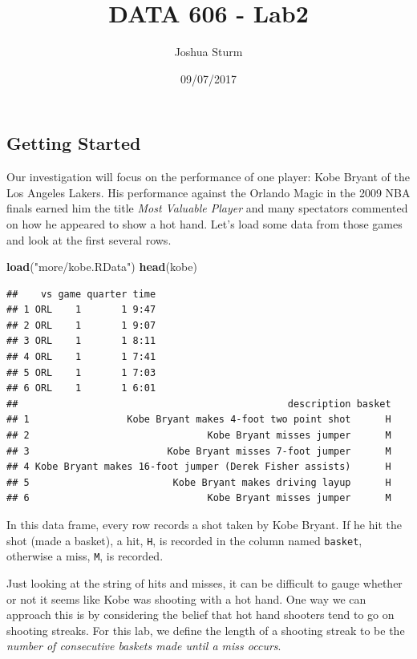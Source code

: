 \documentclass[]{article}
\title{DATA 606 - Lab2}
\author{Joshua Sturm}
\date{09/07/2017}
\newenvironment{Shaded}{\begin{snugshade}}{\end{snugshade}}
\newcommand{\KeywordTok}[1]{\textcolor[rgb]{0.13,0.29,0.53}{\textbf{{#1}}}}
\newcommand{\StringTok}[1]{\textcolor[rgb]{0.31,0.60,0.02}{{#1}}}
\newcommand{\NormalTok}[1]{{#1}}
\begin{document}
\maketitle

\subsection{Getting Started}\label{getting-started}

Our investigation will focus on the performance of one player: Kobe
Bryant of the Los Angeles Lakers. His performance against the Orlando
Magic in the 2009 NBA finals earned him the title \emph{Most Valuable
Player} and many spectators commented on how he appeared to show a hot
hand. Let's load some data from those games and look at the first
several rows.

\begin{Shaded}
\begin{Highlighting}[]
\KeywordTok{load}\NormalTok{(}\StringTok{"more/kobe.RData"}\NormalTok{)}
\KeywordTok{head}\NormalTok{(kobe)}
\end{Highlighting}
\end{Shaded}

\begin{verbatim}
##    vs game quarter time
## 1 ORL    1       1 9:47
## 2 ORL    1       1 9:07
## 3 ORL    1       1 8:11
## 4 ORL    1       1 7:41
## 5 ORL    1       1 7:03
## 6 ORL    1       1 6:01
##                                               description basket
## 1                 Kobe Bryant makes 4-foot two point shot      H
## 2                               Kobe Bryant misses jumper      M
## 3                        Kobe Bryant misses 7-foot jumper      M
## 4 Kobe Bryant makes 16-foot jumper (Derek Fisher assists)      H
## 5                         Kobe Bryant makes driving layup      H
## 6                               Kobe Bryant misses jumper      M
\end{verbatim}

In this data frame, every row records a shot taken by Kobe Bryant. If he
hit the shot (made a basket), a hit, \texttt{H}, is recorded in the
column named \texttt{basket}, otherwise a miss, \texttt{M}, is recorded.

Just looking at the string of hits and misses, it can be difficult to
gauge whether or not it seems like Kobe was shooting with a hot hand.
One way we can approach this is by considering the belief that hot hand
shooters tend to go on shooting streaks. For this lab, we define the
length of a shooting streak to be the \emph{number of consecutive
baskets made until a miss occurs}.
\end{document}
